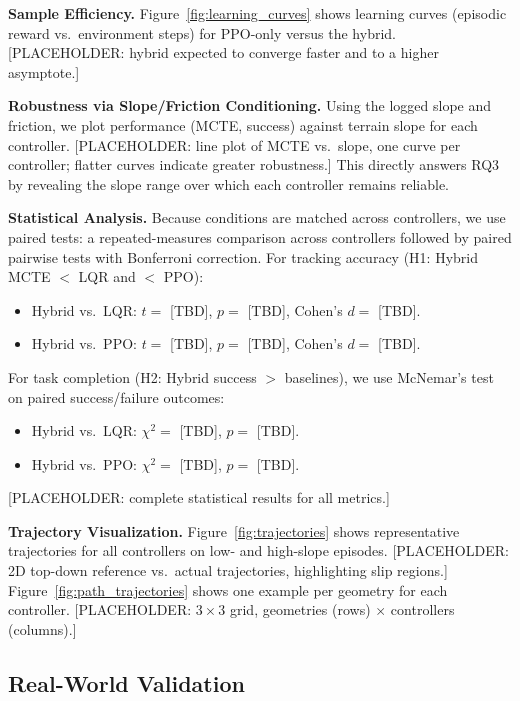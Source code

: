 \documentclass[conference]{IEEEtran}
\begin{document}
\noindent\textbf{Sample Efficiency.}
Figure~\ref{fig:learning_curves} shows learning curves (episodic reward vs.\ environment steps) for PPO-only versus the hybrid. [PLACEHOLDER: hybrid expected to converge faster and to a higher asymptote.]

\noindent\textbf{Robustness via Slope/Friction Conditioning.}
Using the logged slope and friction, we plot performance (MCTE, success) against terrain slope for each controller. [PLACEHOLDER: line plot of MCTE vs.\ slope, one curve per controller; flatter curves indicate greater robustness.] This directly answers RQ3 by revealing the slope range over which each controller remains reliable.

\noindent\textbf{Statistical Analysis.}
Because conditions are matched across controllers, we use paired tests: a repeated-measures comparison across controllers followed by paired pairwise tests with Bonferroni correction.
For tracking accuracy (H1: Hybrid MCTE $<$ LQR and $<$ PPO):
\begin{itemize}
\item Hybrid vs.\ LQR: $t=$ [TBD], $p=$ [TBD], Cohen's $d=$ [TBD].
\item Hybrid vs.\ PPO: $t=$ [TBD], $p=$ [TBD], Cohen's $d=$ [TBD].
\end{itemize}
For task completion (H2: Hybrid success $>$ baselines), we use McNemar's test on paired success/failure outcomes:
\begin{itemize}
\item Hybrid vs.\ LQR: $\chi^2=$ [TBD], $p=$ [TBD].
\item Hybrid vs.\ PPO: $\chi^2=$ [TBD], $p=$ [TBD].
\end{itemize}
[PLACEHOLDER: complete statistical results for all metrics.]

\noindent\textbf{Trajectory Visualization.}
Figure~\ref{fig:trajectories} shows representative trajectories for all controllers on low- and high-slope episodes. [PLACEHOLDER: 2D top-down reference vs.\ actual trajectories, highlighting slip regions.] Figure~\ref{fig:path_trajectories} shows one example per geometry for each controller. [PLACEHOLDER: $3\times3$ grid, geometries (rows) $\times$ controllers (columns).]

\subsection{Real-World Validation}
\end{document}

